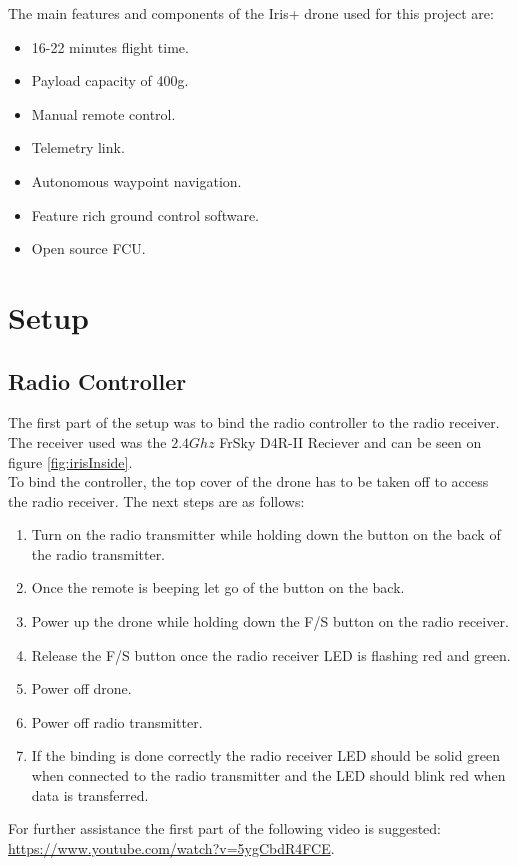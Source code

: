 \newpage

The main features and components of the Iris+ drone used for this project are:
\begin{itemize}
\item 16-22 minutes flight time.
\item Payload capacity of 400g.
\item Manual remote control.
\item Telemetry link.
\item Autonomous waypoint navigation.
\item Feature rich ground control software.
\item Open source FCU. %
\end{itemize}



\section{Setup}
\label{sec:setup}
\subsection*{Radio Controller}
The first part of the setup was to bind the radio controller to the radio receiver. The receiver
used was the $2.4 Ghz$ FrSky D4R-II Reciever \cite{Ref:FrSky} and can be seen on figure
\ref{fig:irisInside}.
\\
To bind the controller, the top cover of the drone has to be taken off to access the radio receiver.
The next steps are as follows:
\begin{enumerate}
\item Turn on the radio transmitter while holding down the button on the back of the radio transmitter.
\item Once the remote is beeping let go of the button on the back.
\item Power up the drone while holding down the F/S button on the radio receiver.
\item Release the F/S button once the radio receiver LED is flashing red and green.
\item Power off drone.
\item Power off radio transmitter.
\item If the binding is done correctly the radio receiver LED should be solid green when connected
to the radio transmitter and the LED should blink red when data is transferred.
\end{enumerate}
For further assistance the first part of the following video is suggested:
\url{https://www.youtube.com/watch?v=5ygCbdR4FCE}.

